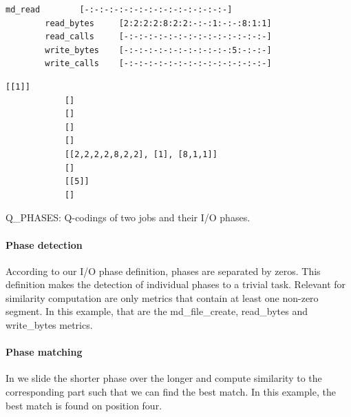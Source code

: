 \documentclass{jhps}
\begin{document}
\begin{listing}
\begin{minipage}{\textwidth}
\begin{minipage}{0.60\textwidth}
\begin{lstlisting}[basicstyle=\fontsize{8}{8}\ttfamily]
		md_read        [-:-:-:-:-:-:-:-:-:-:-:-:-:-:-]
		read_bytes     [2:2:2:2:8:2:2:-:-:1:-:-:8:1:1]
		read_calls     [-:-:-:-:-:-:-:-:-:-:-:-:-:-:-]
		write_bytes    [-:-:-:-:-:-:-:-:-:-:-:5:-:-:-]
		write_calls    [-:-:-:-:-:-:-:-:-:-:-:-:-:-:-]
		\end{lstlisting}
		\vspace{-2em}
		\label{lst:sim:pm_quant:job_b}
		\end{minipage}
		\noindent\begin{minipage}{0.39\textwidth}
			\begin{lstlisting}[basicstyle=\fontsize{8}{8}\ttfamily]
			[[1]]
			[]
			[]
			[]
			[]
			[[2,2,2,2,8,2,2], [1], [8,1,1]]
			[]
			[[5]]
			[]
			\end{lstlisting}
			\vspace{-2em}
			\label{lst:sim:pm_quant:phases:job_b}
		\end{minipage}
	\end{minipage}
	\caption{Q\_PHASES: Q-codings of two jobs and their I/O phases.}
	\label{lst:sim:pm_quant}
\end{listing}



\paragraph{Phase detection}
According to our I/O phase definition, phases are separated by zeros.
This definition makes the detection of individual phases to a trivial task.
Relevant for similarity computation are only metrics that contain at least one non-zero segment.
In this example, that are the md\_file\_create, read\_bytes and write\_bytes metrics.


\paragraph{Phase matching}
In  we slide the shorter phase over the longer and compute similarity to the corresponding part such that we can find the best match.
In this example, the best match is found on position four.
\end{document}
